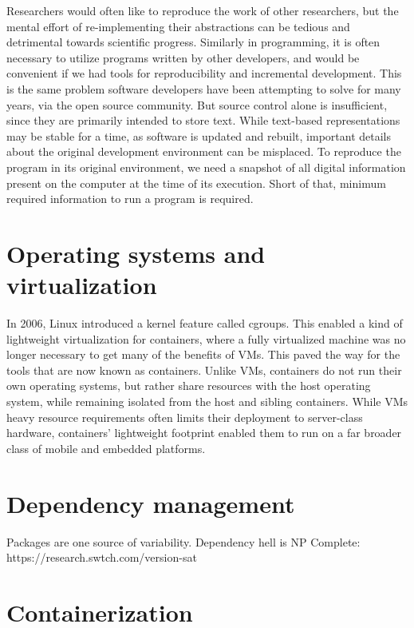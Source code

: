 \documentclass[12pt,initial,twoside,maitrise]{dms}
\numberwithin{equation}{section}
\numberwithin{table}{chapter}
\numberwithin{figure}{chapter}
\begin{document}
Researchers would often like to reproduce the work of other researchers, but the mental effort of re-implementing their abstractions can be tedious and detrimental towards scientific progress. Similarly in programming, it is often necessary to utilize programs written by other developers, and would be convenient if we had tools for reproducibility and incremental development. This is the same problem software developers have been attempting to solve for many years, via the open source community. But source control alone is insufficient, since they are primarily intended to store text. While text-based representations may be stable for a time, as software is updated and rebuilt, important details about the original development environment can be misplaced. To reproduce the program in its original environment, we need a snapshot of all digital information present on the computer at the time of its execution. Short of that, minimum required information to run a program is required.

\section{Operating systems and virtualization}\label{sec:os-and-virtualization}

In 2006, Linux introduced a kernel feature called cgroups. This enabled a kind of lightweight virtualization for containers, where a fully virtualized machine was no longer necessary to get many of the benefits of VMs. This paved the way for the tools that are now known as containers. Unlike VMs, containers do not run their own operating systems, but rather share resources with the host operating system, while remaining isolated from the host and sibling containers. While VMs heavy resource requirements often limits their deployment to server-class hardware, containers' lightweight footprint enabled them to run on a far broader class of mobile and embedded platforms.

\section{Dependency management}\label{sec:dependency-management}

Packages are one source of variability. Dependency hell is NP Complete: https://research.swtch.com/version-sat

\section{Containerization}\label{sec:containerization}
\end{document}
